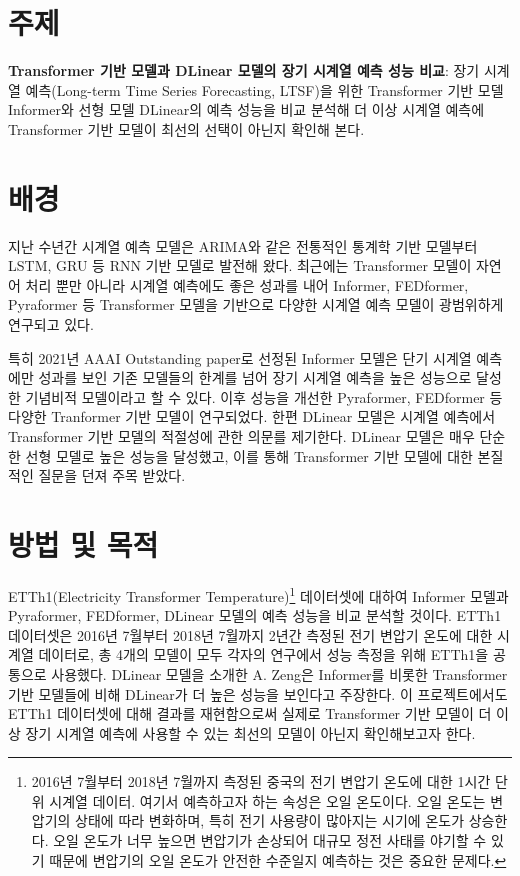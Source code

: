 \maketitle

\section{주제}

\textbf{Transformer 기반 모델과 DLinear 모델의 장기 시계열 예측 성능 비교}: 장기 시계열 예측(Long-term Time Series Forecasting, LTSF)을 위한 Transformer 기반 모델 Informer\cite{zhou2021}와 선형 모델 DLinear\cite{zeng2022}의 예측 성능을 비교 분석해 더 이상 시계열 예측에 Transformer 기반 모델이 최선의 선택이 아닌지 확인해 본다.

\section{배경}

지난 수년간 시계열 예측 모델은 ARIMA와 같은 전통적인 통계학 기반 모델부터 LSTM, GRU 등 RNN 기반 모델로 발전해 왔다. 최근에는 Transformer 모델이 자연어 처리 뿐만 아니라 시계열 예측에도 좋은 성과를 내어 Informer, FEDformer, Pyraformer 등 Transformer 모델을 기반으로 다양한 시계열 예측 모델이 광범위하게 연구되고 있다.

특히 2021년 AAAI Outstanding paper로 선정된 Informer 모델은 단기 시계열 예측에만 성과를 보인 기존 모델들의 한계를 넘어 장기 시계열 예측을 높은 성능으로 달성한 기념비적 모델이라고 할 수 있다. 이후 성능을 개선한 Pyraformer\cite{liu2022}, FEDformer\cite{zhou2022} 등 다양한 Tranformer 기반 모델이 연구되었다. 한편 DLinear 모델은 시계열 예측에서 Transformer 기반 모델의 적절성에 관한 의문를 제기한다. DLinear 모델은 매우 단순한 선형 모델로 높은 성능을 달성했고, 이를 통해 Transformer 기반 모델에 대한 본질적인 질문을 던져 주목 받았다.

\section{방법 및 목적}

ETTh1(Electricity Transformer Temperature)\footnote{2016년 7월부터 2018년 7월까지 측정된 중국의 전기 변압기 온도에 대한 1시간 단위 시계열 데이터. 여기서 예측하고자 하는 속성은 오일 온도이다. 오일 온도는 변압기의 상태에 따라 변화하며, 특히 전기 사용량이 많아지는 시기에 온도가 상승한다. 오일 온도가 너무 높으면 변압기가 손상되어 대규모 정전 사태를 야기할 수 있기 때문에 변압기의 오일 온도가 안전한 수준일지 예측하는 것은 중요한 문제다.} 데이터셋에 대하여 Informer 모델과 Pyraformer, FEDformer, DLinear 모델의 예측 성능을 비교 분석할 것이다. ETTh1 데이터셋은 2016년 7월부터 2018년 7월까지 2년간 측정된 전기 변압기 온도에 대한 시계열 데이터로, 총 4개의 모델이 모두 각자의 연구에서 성능 측정을 위해 ETTh1을 공통으로 사용했다. DLinear 모델을 소개한 A. Zeng은 Informer를 비롯한 Transformer 기반 모델들에 비해 DLinear가 더 높은 성능을 보인다고 주장한다. 이 프로젝트에서도 ETTh1 데이터셋에 대해 결과를 재현함으로써 실제로 Transformer 기반 모델이 더 이상 장기 시계열 예측에 사용할 수 있는 최선의 모델이 아닌지 확인해보고자 한다.

